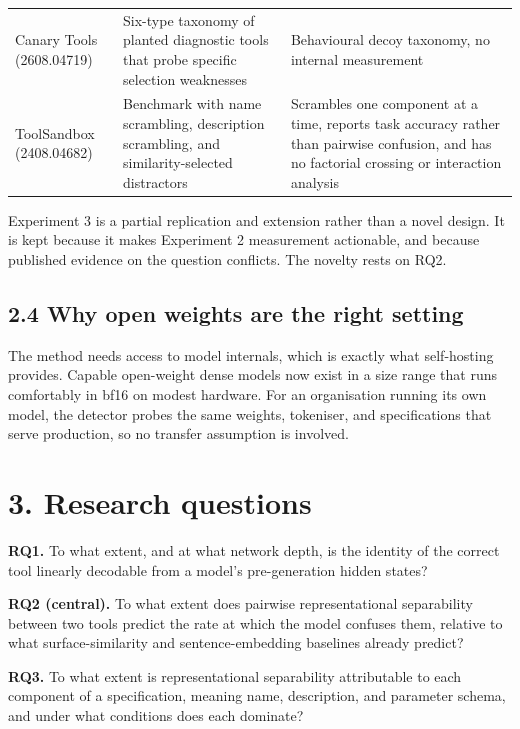 \documentclass[11pt,a4paper]{article}
\begin{document}
\begin{tabular}{@{}L{3.2cm}L{5.9cm}L{6.2cm}@{}}
Canary Tools (2608.04719) & Six-type taxonomy of planted diagnostic tools that probe specific selection weaknesses & Behavioural decoy taxonomy, no internal measurement \\
ToolSandbox (2408.04682) & Benchmark with name scrambling, description scrambling, and similarity-selected distractors & Scrambles one component at a time, reports task accuracy rather than pairwise confusion, and has no factorial crossing or interaction analysis \\
\bottomrule
\end{tabular}

Experiment 3 is a partial replication and extension rather than a novel design. It is kept because it
makes Experiment 2 measurement actionable, and because published evidence on the question
conflicts. The novelty rests on RQ2.

\subsection*{2.4 Why open weights are the right setting}

The method needs access to model internals, which is exactly what self-hosting provides. Capable
open-weight dense models now exist in a size range that runs comfortably in bf16 on modest
hardware. For an organisation running its own model, the detector probes the same weights,
tokeniser, and specifications that serve production, so no transfer assumption is involved.

\section*{3. Research questions}

\textbf{RQ1.} To what extent, and at what network depth, is the identity of the correct tool linearly
decodable from a model's pre-generation hidden states?

\textbf{RQ2 (central).} To what extent does pairwise representational separability between two tools
predict the rate at which the model confuses them, relative to what surface-similarity and
sentence-embedding baselines already predict?

\textbf{RQ3.} To what extent is representational separability attributable to each component of a
specification, meaning name, description, and parameter schema, and under what conditions does
each dominate?
\end{document}
